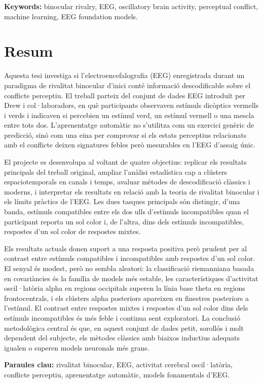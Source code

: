 \documentclass[11pt,a4paper,chapterprefix=false,parskip=false]{scrreprt}
\begin{document}
\textbf{Keywords:} binocular rivalry, EEG, oscillatory brain activity, perceptual conflict, machine learning, EEG foundation models.

\chapter*{Resum}
Aquesta tesi investiga si l'electroencefalografia (EEG) enregistrada durant un paradigma de rivalitat binocular d'inici conté informació descodificable sobre el conflicte perceptiu. El treball parteix del conjunt de dades EEG introduït per Drew i col·laboradors, en què participants observaven estímuls dicòptics vermells i verds i indicaven si percebien un estímul verd, un estímul vermell o una mescla entre tots dos. L'aprenentatge automàtic no s'utilitza com un exercici genèric de predicció, sinó com una eina per comprovar si els estats perceptius relacionats amb el conflicte deixen signatures febles però mesurables en l'EEG d'assaig únic.

El projecte es desenvolupa al voltant de quatre objectius: replicar els resultats principals del treball original, ampliar l'anàlisi estadística cap a clústers espaciotemporals en canals i temps, avaluar mètodes de descodificació clàssics i moderns, i interpretar els resultats en relació amb la teoria de rivalitat binocular i els límits pràctics de l'EEG. Les dues tasques principals són distingir, d'una banda, estímuls compatibles entre els dos ulls d'estímuls incompatibles quan el participant reporta un sol color i, de l'altra, dins dels estímuls incompatibles, respostes d'un sol color de respostes mixtes.

Els resultats actuals donen suport a una resposta positiva però prudent per al contrast entre estímuls compatibles i incompatibles amb respostes d'un sol color. El senyal és modest, però no sembla aleatori: la classificació riemanniana basada en covariàncies és la família de models més estable, les característiques d'activitat oscil·latòria alpha en regions occipitals superen la línia base theta en regions frontocentrals, i els clústers alpha posteriors apareixen en finestres posteriors a l'estímul. El contrast entre respostes mixtes i respostes d'un sol color dins dels estímuls incompatibles és més feble i continua sent exploratori. La conclusió metodològica central és que, en aquest conjunt de dades petit, sorollós i molt dependent del subjecte, els mètodes clàssics amb biaixos inductius adequats igualen o superen models neuronals més grans.

\textbf{Paraules clau:} rivalitat binocular, EEG, activitat cerebral oscil·latòria, conflicte perceptiu, aprenentatge automàtic, models fonamentals d'EEG.
\end{document}
